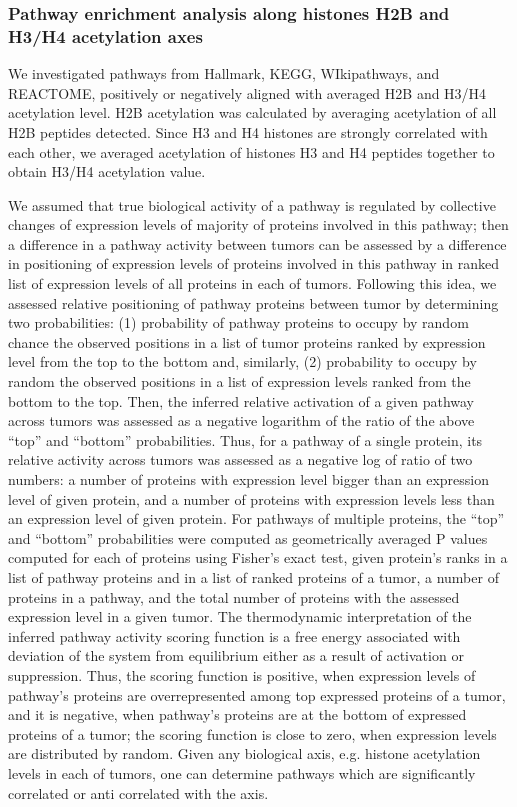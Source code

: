 \subsubsection{Pathway enrichment analysis along histones H2B and H3/H4 acetylation axes}
We investigated pathways from Hallmark, KEGG, WIkipathways, and REACTOME, positively or negatively aligned with averaged H2B and H3/H4 acetylation level. H2B acetylation was calculated by averaging acetylation of all H2B peptides detected. Since H3 and H4 histones are strongly correlated with each other, we averaged acetylation of histones H3 and H4 peptides together to obtain H3/H4 acetylation value.

We assumed that true biological activity of a pathway is regulated by collective changes of expression levels of majority of proteins involved in this pathway; then a difference in a pathway activity between tumors can be assessed by a difference in positioning of expression levels of proteins involved in this pathway in ranked list of expression levels of all proteins in each of tumors. Following this idea, we assessed relative positioning of pathway proteins between tumor by determining two probabilities: (1) probability of pathway proteins to occupy by random chance the observed positions in a list of tumor proteins ranked by expression level from the top to the bottom and, similarly, (2) probability to occupy by random the observed positions in a list of expression levels ranked from the bottom to the top. Then, the inferred relative activation of a given pathway across tumors was assessed as a negative logarithm of the ratio of the above ``top'' and ``bottom'' probabilities. Thus, for a pathway of a single protein, its relative activity across tumors was assessed as a negative log of ratio of two numbers: a number of proteins with expression level bigger than an expression level of given protein, and a number of proteins with expression levels less than an expression level of given protein. For pathways of multiple proteins, the ``top'' and ``bottom'' probabilities were computed as geometrically averaged P values computed for each of proteins using Fisher’s exact test, given protein’s ranks in a list of pathway proteins and in a list of ranked proteins of a tumor, a number of proteins in a pathway, and the total number of proteins with the assessed expression level in a given tumor. The thermodynamic interpretation of the inferred pathway activity scoring function is a free energy associated with deviation of the system from equilibrium either as a result of activation or suppression. Thus, the scoring function is positive, when expression levels of pathway’s proteins are overrepresented among top expressed proteins of a tumor, and it is negative, when pathway’s proteins are at the bottom of expressed proteins of a tumor; the scoring function is close to zero, when expression levels are distributed by random. Given any biological axis, e.g. histone acetylation levels in each of tumors, one can determine pathways which are significantly correlated or anti correlated with the axis.

